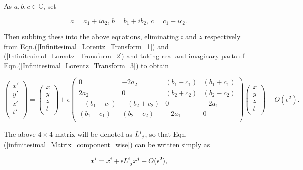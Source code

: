 \noindent As $a,b,c \in \mathbb{C}$, set 

\begin{equation*}
a = a_1 +ia_2 \text{,  } b = b_1 +ib_2 \text{,  } c = c_1 +ic_2 \text{.} 
\end{equation*}

\noindent Then subbing these into the above equations, eliminating $t$ and $z$ respectively from Eqn.(\ref{Infinitesimal_Lorentz_Transform_1}) and (\ref{Infinitesimal_Lorentz_Transform_2}) and taking real and imaginary parts of Eqn.(\ref{Infinitesimal_Lorentz_Transform_3}) to obtain

\begin{equation}\label{infinitesimal_Matrix_component_wise}
\left(
\begin{array}{c}
x' \\
y'\\
z'\\
t'\\
\end{array}
\right)
=
\left(
\begin{array}{c}
x \\
y\\
z\\
t\\
\end{array}
\right)
+ \epsilon
\left(
\begin{array}{cccc}
0            & -2a_2        & (b_1 - c_1) & (b_1+c_1)\\
2a_2         & 0            & (b_2+c_2)   & (b_2 - c_2) \\
-(b_1 - c_1) & -(b_2 + c_2) & 0           & -2a_1 \\
(b_1 + c_1)  & (b_2-c_2)    & -2a_1       & 0 \\
\end{array}
\right)
\left(
\begin{array}{c}
x \\
y\\
z\\
t\\
\end{array}
\right)
+ O(\epsilon^2).
\end{equation}

\noindent The above $4 \times 4$ matrix will be denoted as $\tensor{L}{^i_j}$, so that Eqn.(\ref{infinitesimal_Matrix_component_wise}) can be written simply as 

\begin{equation}\label{Infinitesimal_Infinitesimal_Lorentz_Transformation}
\bar{x}^i = x^i + \epsilon \tensor{L}{^{i}_{j}} x^j + O(\epsilon^2),
\end{equation}


